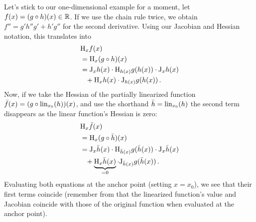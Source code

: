Let's stick to our one-dimensional example for a moment, \ie let $f(x) = (g \circ h)(x) \in {\mathbb{R}}$.
If we use the chain rule twice, we obtain $f'' = g' h'' g' + h' g''$ for the second derivative. Using our Jacobian and Hessian notation, this translates into
\begin{align*}
  &\mathrm{H}_x f(x)
  \\
  &=\mathrm{H}_x (g \circ h)(x)
  \\
  &=\mathrm{J}_x h(x) \cdot \mathrm{H}_{h(x)} g(h(x)) \cdot \mathrm{J}_x h(x)
  \\
  &\phantom{= }+
    \mathrm{H}_x h(x) \cdot \mathrm{J}_{h(x)} g(h(x))\,.
\end{align*}
Now, if we take the Hessian of the partially linearized function $\bar{f}(x) = (g \circ \operatorname{lin}_{x_0}(h))(x)$, and use the shorthand $\bar{h} = \operatorname{lin}_{x_0}(h)$ the second term disappears as the linear function's Hessian is zero:
\begin{align*}
  &\mathrm{H}_x \bar{f}(x)
  \\
  &=\mathrm{H}_x (g \circ \bar{h})(x)
  \\
  &=\mathrm{J}_x \bar{h}(x) \cdot \mathrm{H}_{\bar{h}(x)} g(\bar{h}(x)) \cdot \mathrm{J}_x \bar{h}(x)
  \\
  &\phantom{= }+
    \underbrace{\mathrm{H}_x \bar{h}(x)}_{= 0} \cdot \mathrm{J}_{\bar{h}(x)} g(\bar{h}(x))\,.
\end{align*}
Evaluating both equations at the anchor point (setting $x = x_0$), we see that their first terms coincide (remember from  that the linearized function's value and Jacobian coincide with those of the original function when evaluated at the anchor point).

